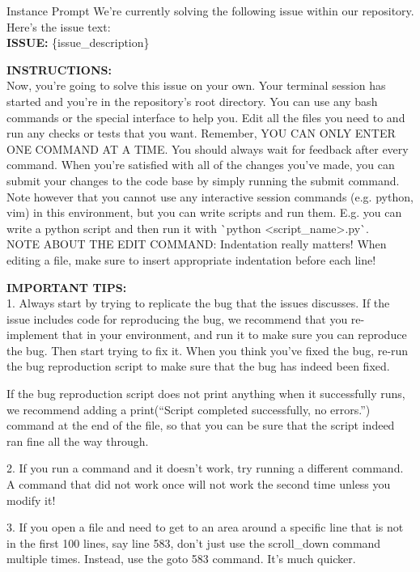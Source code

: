 {
\begin{promptbox}{Instance Prompt}
We're currently solving the following issue within our repository. Here's the issue text: \\
\textbf{ISSUE:} \{issue\_description\}
\smallskip

\textbf{INSTRUCTIONS:} \\
Now, you're going to solve this issue on your own. Your terminal session has started and you're in the repository's root directory. You can use any bash commands or the special interface to help you. Edit all the files you need to and run any checks or tests that you want. 
Remember, YOU CAN ONLY ENTER ONE COMMAND AT A TIME. You should always wait for feedback after every command. 
When you're satisfied with all of the changes you've made, you can submit your changes to the code base by simply running the submit command.
Note however that you cannot use any interactive session commands (e.g. python, vim) in this environment, but you can write scripts and run them. E.g. you can write a python script and then run it with \`{}python \textless{}script\_name\textgreater{}.py\`{}. \\
NOTE ABOUT THE EDIT COMMAND: Indentation really matters! When editing a file, make sure to insert appropriate indentation before each line! 
\smallskip

\textbf{IMPORTANT TIPS:} \\
1. Always start by trying to replicate the bug that the issues discusses. 
If the issue includes code for reproducing the bug, we recommend that you re-implement that in your environment, and run it to make sure you can reproduce the bug.
Then start trying to fix it.
When you think you've fixed the bug, re-run the bug reproduction script to make sure that the bug has indeed been fixed.
 
If the bug reproduction script does not print anything when it successfully runs, we recommend adding a print(``Script completed successfully, no errors.'') command at the end of the file,
so that you can be sure that the script indeed ran fine all the way through. 

2. If you run a command and it doesn't work, try running a different command. A command that did not work once will not work the second time unless you modify it!

3. If you open a file and need to get to an area around a specific line that is not in the first 100 lines, say line 583, don't just use the scroll\_down command multiple times. Instead, use the goto 583 command. It's much quicker. 
 

\end{promptbox}}
